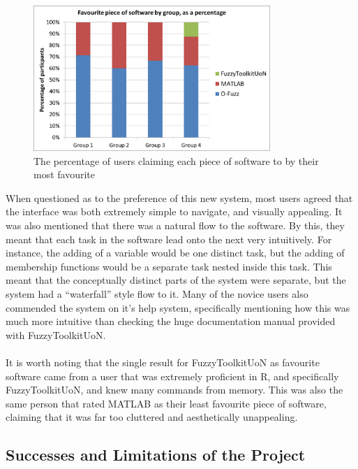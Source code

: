 \begin{figure}[ht!]
	\begin{center}
		\includegraphics[width=0.8\textwidth]{images/mostFav.png}
	\end{center}
	\vspace{-5mm}
	\captionsetup{justification=centering,margin=2cm}	
	\caption{The percentage of users claiming each piece of software to by their most favourite}
	\label{fig:mostLiked}
	\vspace{-2mm}
\end{figure}
\noindent 
When questioned as to the preference of this new system, most users agreed that the interface was both extremely simple to navigate, and visually appealing. It was also mentioned that there was a natural flow to the software. By this, they meant that each task in the software lead onto the next very intuitively. For instance, the adding of a variable would be one distinct task, but the adding of membership functions would be a separate task nested inside this task. This meant that the conceptually distinct parts of the system were separate, but the system had a ``waterfall'' style flow to it. Many of the novice users also commended the system on it's help system, specifically mentioning how this was much more intuitive than checking the huge documentation manual provided with FuzzyToolkitUoN.\ \\
\ \\
It is worth noting that the single result for FuzzyToolkitUoN as favourite software came from a user that was extremely proficient in R, and specifically FuzzyToolkitUoN, and knew many commands from memory. This was also the same person that rated MATLAB as their least favourite piece of software, claiming that it was far too cluttered and aesthetically unappealing.
	

\subsection{Successes and Limitations of the Project}

